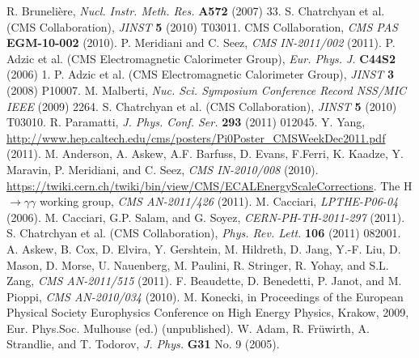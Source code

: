 \documentclass[12pt, letterpaper]{report}
\begin{document}
\begin{thebibliography}{99}
 R. Bruneli\`ere, \textit{Nucl. Instr. Meth. Res.} \textbf{A572} (2007) 33.
 S. Chatrchyan et al. (CMS Collaboration), \textit{JINST} \textbf{5} (2010) T03011.
 CMS Collaboration, \textit{CMS PAS} \textbf{EGM-10-002} (2010).
 P. Meridiani and C. Seez, \textit{CMS IN-2011/002} (2011).
 P. Adzic et al. (CMS Electromagnetic Calorimeter Group), \textit{Eur. Phys. J.} \textbf{C44S2} (2006) 1.
 P. Adzic et al. (CMS Electromagnetic Calorimeter Group), \textit{JINST} \textbf{3} (2008) P10007.
 M. Malberti, \textit{Nuc. Sci. Symposium Conference Record NSS/MIC IEEE} (2009) 2264.
 S. Chatrchyan et al. (CMS Collaboration), \textit{JINST} \textbf{5} (2010) T03010.
 R. Paramatti, \textit{J. Phys. Conf. Ser.} \textbf{293} (2011) 012045.
 Y. Yang, \url{http://www.hep.caltech.edu/cms/posters/Pi0Poster_CMSWeekDec2011.pdf} (2011).
 M. Anderson, A. Askew, A.F. Barfuss, D. Evans, F.Ferri, K. Kaadze, Y. 
Maravin, P. Meridiani, and C. Seez, \textit{CMS IN-2010/008} (2010).
 \url{https://twiki.cern.ch/twiki/bin/view/CMS/ECALEnergyScaleCorrections}.
 The H$\rightarrow\gamma\gamma$ working group, \textit{CMS AN-2011/426} (2011).
 M. Cacciari, \textit{LPTHE-P06-04} (2006).
 M. Cacciari, G.P. Salam, and G. Soyez, \textit{CERN-PH-TH-2011-297} (2011).
 S. Chatrchyan et al. (CMS Collaboration), \textit{Phys. Rev. Lett.} \textbf{106} (2011) 082001.
 A. Askew, B. Cox, D. Elvira, Y. Gershtein, M. Hildreth, D. Jang, Y.-F. Liu, D. Mason, D. Morse, U. Nauenberg, M. Paulini, R. Stringer, R. Yohay, and S.L. Zang, \textit{CMS AN-2011/515} (2011).
 F. Beaudette, D. Benedetti, P. Janot, and M. Pioppi, \textit{CMS AN-2010/034} (2010).
 M. Konecki, in Proceedings of the European Physical Society  Europhysics Conference on High Energy Physics, Krakow, 2009, Eur. Phys.Soc. Mulhouse (ed.) (unpublished).
 W. Adam, R. Fr\"uwirth, A. Strandlie, and T. Todorov, \textit{J. Phys.} \textbf{G31} No. 9 (2005).

\end{thebibliography}
\end{document}
